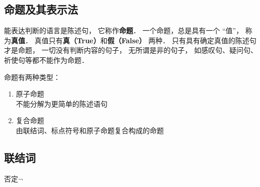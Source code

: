 \subsection{命题及其表示法}



\begin{definition}{}
能表达判断的语言是陈述句， 它称作\textbf{命题}． 一个命题，总是具有一个 “值”， 称为\textbf{真值}． 真值只有\textbf{真（True）}和\textbf{假（False）} 两种． 只有具有确定真值的陈述句才是命题， 一切没有判断内容的句子， 无所谓是非的句子， 如感叹句、疑问句、祈使句等都不能作为命题．

命题有两种类型：
\begin{enumerate}
\item 原子命题\\不能分解为更简单的陈述语句
\item 复合命题\\由联结词、标点符号和原子命题复合构成的命题
\end{enumerate} 
\end{definition}

\subsection{联结词}

\begin{definition}{否定$\neg$ }\end{definition} 
